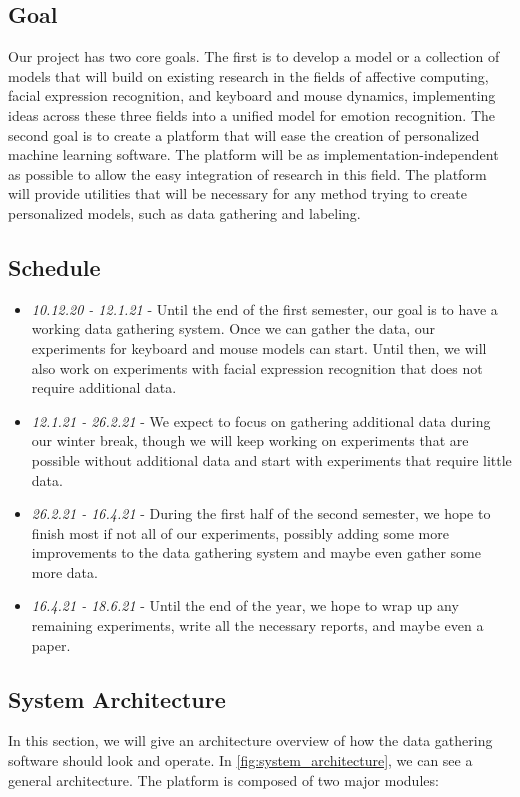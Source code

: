 \documentclass[../main.tex]{subfiles}
\begin{document}
\subsection{Goal}
Our project has two core goals. The first is to develop a model or a collection of models that will build on existing research in
the fields of affective computing, facial expression recognition, and keyboard and mouse dynamics, implementing ideas across these
three fields into a unified model for emotion recognition.
The second goal is to create a platform that will ease the creation of personalized machine learning software.
The platform will be as implementation-independent as possible to allow the easy integration of research in this field.
The platform will provide utilities that will be necessary for any method trying to create personalized models,
such as data gathering and labeling.

\subsection{Schedule}

\begin{itemize}
    \item \emph{10.12.20 - 12.1.21} - Until the end of the first semester, our goal is to have a working data gathering system.
        Once we can gather the data, our experiments for keyboard and mouse models can start. Until then,
        we will also work on experiments with facial expression recognition that does not require additional data. 
    \item \emph{12.1.21 - 26.2.21} - We expect to focus on gathering additional data during our winter break,
        though we will keep working on experiments that are possible without additional data and start with experiments that require
        little data.
    \item \emph{26.2.21 - 16.4.21} - During the first half of the second semester, we hope to finish most if not all of our experiments,
        possibly adding some more improvements to the data gathering system and maybe even gather some more data. 
    \item \emph{16.4.21 - 18.6.21} - Until the end of the year, we hope to wrap up any remaining experiments, write all the necessary reports,
        and maybe even a paper.
\end{itemize}


\subsection{System Architecture}
In this section, we will give an architecture overview of how the data gathering software should look and operate.
In \ref{fig:system_architecture}, we can see a general architecture. The platform is composed of two major modules:
\end{document}
